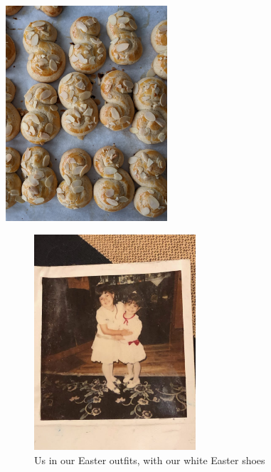 \begin{marginfigure}
  \includegraphics[width=60mm]{monanteras/images/Easter koulourakia.jpg}
\end{marginfigure}

\begin{figure}
  \includegraphics[width=60mm]{monanteras/images/IMG_20241009_171710.jpg}
  \caption{Us in our Easter outfits, with our white Easter shoes}
\end{figure}
